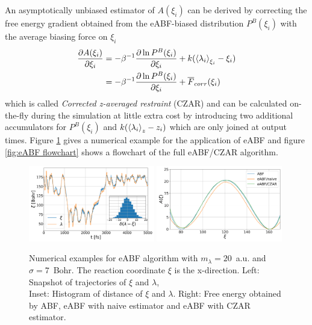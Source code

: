 An asymptotically unbiased estimator of $A(\xi_i)$ can be derived by correcting the free energy gradient obtained from the eABF-biased distribution $P^B(\xi_i)$ with the average biasing force on $\xi_i$
\begin{equation}
  \begin{split}
\frac{\partial A(\xi_i)}{\partial \xi_i} &= -\beta^{-1}\frac{\partial \ln P^B(\xi_i)}{\partial \xi_i} + k(\braket{\lambda_i}_{\xi_i}-\xi_{i}) \\
  &= -\beta^{-1}\frac{\partial \ln P^B(\xi_i)}{\partial \xi_i} + \overline{F}_{corr}(\xi_i)
\end{split}
  \label{eq:CZAR}
\end{equation}
which is called \textit{Corrected z-averaged restraint} (CZAR)\autocite{lesage2017smoothed} and can be calculated on-the-fly during the simulation at little extra cost by introducing two additional accumulators for $P^B(\xi_i)$ and $k(\braket{\lambda_i}_{z}-z_{i})$ which are only joined at output times. Figure \ref{fig:eABF traj} gives a numerical example for the application of eABF and figure \ref{fig:eABF flowchart} shows a flowchart of the full eABF/CZAR algorithm.

\begin{figure}[H]
    \centering
    \includegraphics[width=0.49\textwidth]{bilder/eABF_traj}
    \includegraphics[width=0.49\textwidth]{bilder/eABF_freeE}
    \caption{Numerical examples for eABF algorithm with $m_\lambda=20$~a.u. and $\sigma=7$~Bohr. The reaction coordinate $\xi$ is the x-direction. Left: Snapshot of trajectories of $\xi$ and $\lambda$, \\
    Inset: Histogram of distance of $\xi$ and $\lambda$. Right: Free energy obtained by ABF, eABF with naive estimator and eABF with CZAR estimator.}
\label{fig:eABF traj}%
\end{figure}

